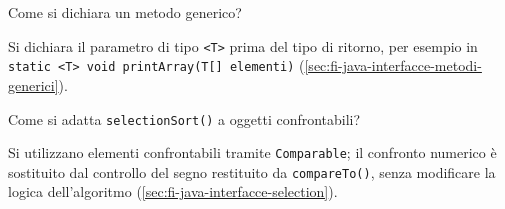 \begin{exercise}
\label{ex:fi-esercizi-java-interfacce-metodo-generico}
Come si dichiara un metodo generico?
\end{exercise}

Si dichiara il parametro di tipo \lstinline|<T>| prima del tipo di ritorno, per esempio in \lstinline|static <T> void printArray(T[] elementi)| (\cref{sec:fi-java-interfacce-metodi-generici}).

\begin{exercise}
\label{ex:fi-esercizi-java-interfacce-array-algs}
Come si adatta \texttt{selectionSort()} a oggetti confrontabili?
\end{exercise}

Si utilizzano elementi confrontabili tramite \texttt{Comparable}; il confronto numerico è sostituito dal controllo del segno restituito da \texttt{compareTo()}, senza modificare la logica dell'algoritmo (\cref{sec:fi-java-interfacce-selection}).
